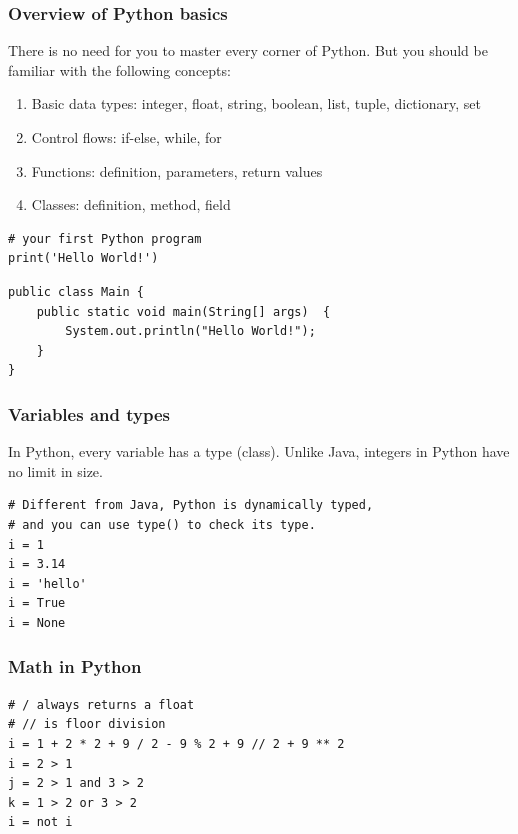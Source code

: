 \documentclass[aspectratio=169, 14pt]{beamer}
\begin{document}
\begin{frame}
	\frametitle{Overview of Python basics}
	There is no need for you to master every corner of Python. But you should be familiar with the following concepts:
	\begin{enumerate}
		\item \alert{Basic data types}: integer, float, string, boolean, list, tuple, dictionary, set
		\item \alert{Control flows}: if-else, while, for
		\item \alert{Functions}: definition, parameters, return values
		\item \alert{Classes}: definition, method, field
	\end{enumerate}
\end{frame}

\begin{frame}[fragile]

	\begin{verbatim}
# your first Python program
print('Hello World!')
  \end{verbatim}

	\begin{verbatim}
public class Main {
    public static void main(String[] args)  {
        System.out.println("Hello World!");
    }
}
  \end{verbatim}
\end{frame}

\begin{frame}[fragile]
	\frametitle{Variables and types}
	In Python, every variable has a type (class). Unlike Java, integers in Python have no limit in size.
	\begin{verbatim}
# Different from Java, Python is dynamically typed,
# and you can use type() to check its type.
i = 1 
i = 3.14
i = 'hello'
i = True
i = None
  \end{verbatim}

\end{frame}

\begin{frame}[fragile]
	\frametitle{Math in Python}

	\begin{verbatim}
# / always returns a float
# // is floor division
i = 1 + 2 * 2 + 9 / 2 - 9 % 2 + 9 // 2 + 9 ** 2
i = 2 > 1
j = 2 > 1 and 3 > 2
k = 1 > 2 or 3 > 2
i = not i
  \end{verbatim}
\end{frame}
\end{document}
